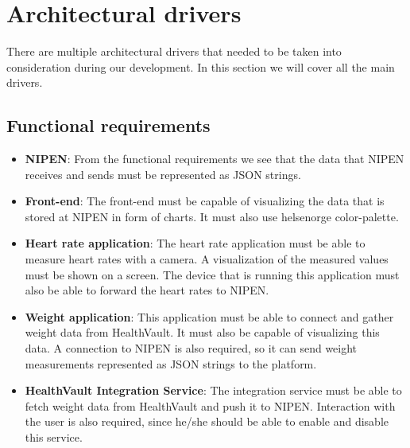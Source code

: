 \section{Architectural drivers}

There are multiple architectural drivers that needed to be taken into consideration during our development.
In this section we will cover all the main drivers.

\subsection{Functional requirements}

\begin{itemize}
\item\textbf{NIPEN}: 
From the functional requirements we see that the data that NIPEN receives and sends must be represented as JSON strings.

\item\textbf{Front-end}: 
The front-end must be capable of visualizing the data that is stored at NIPEN in form of charts. 
It must also use helsenorge color-palette.

\item\textbf{Heart rate application}: 
The heart rate application must be able to measure heart rates with a camera. 
A visualization of the measured values must be shown on a screen.
The device that is running this application must also be able to forward the heart rates to NIPEN.

\item\textbf{Weight application}: 
This application must be able to connect and gather weight data from HealthVault.
It must also be capable of visualizing this data.
A connection to NIPEN is also required, so it can send weight measurements represented as JSON strings to the platform.

\item\textbf{HealthVault Integration Service}:
The integration service must be able to fetch weight data from HealthVault and push it to NIPEN.
Interaction with the user is also required, since he/she should be able to enable and disable this service.
\end{itemize}

